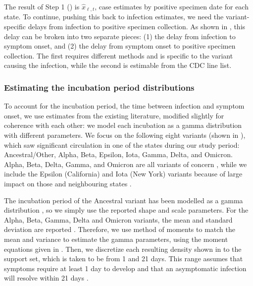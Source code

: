 The result of Step 1 () is $\widehat{x}_{\ell,t}$, case
estimates by positive specimen date for each state. To continue, pushing this
back to infection estimates, we need the variant-specific delays from infection
to positive specimen collection. As shown in , this delay can be broken into two separate pieces: (1) the
delay from infection to symptom onset, and (2) the delay from symptom onset to
positive specimen collection. The first requires different methods and is
specific to the variant causing the infection, while the second is estimable from the CDC line
list.

\subsubsection{Estimating the incubation period distributions} 
\label{sec:incubation}

To account for the incubation period, the time between infection and symptom
onset, we use estimates from the existing literature, modified slightly for
coherence with each other: we model each incubation as a gamma distribution with
different parameters. We focus on the following eight variants (shown in
), which saw significant circulation in one of the \US states
during our study period: Ancestral/Other, Alpha, Beta, Epsilon,
Iota, Gamma, Delta, and Omicron. Alpha, Beta, Delta, Gamma, and Omicron are all
variants of concern \citep{who2021tracking}, while we include the Epsilon
(California) and Iota (New York) variants because of large impact on those and
neighbouring states \citep{yang2022investigation, duerr2021dominance}.

The incubation period of the Ancestral variant has been modelled as a gamma
distribution \citep{tindale2020evidence}, so we simply use the reported shape
and scale parameters. For the Alpha, Beta, Gamma, Delta and Omicron variants,
the mean and standard deviation are reported \citep{tanaka2022shorter,
grant2022impact, ogata2022shorter}. Therefore, we use method of moments to match
the mean and variance to estimate the gamma parameters, using the moment
equations given in . Then, we discretize each resulting density
shown in  to the support set, which is taken to be from 1
and 21 days. This range assumes that symptoms require at least 1 day to develop
\citealp{phcan2021covid} and that an asymptomatic infection will resolve within
21 days \citep{zaki2021estimations,cortes2022sars}.

